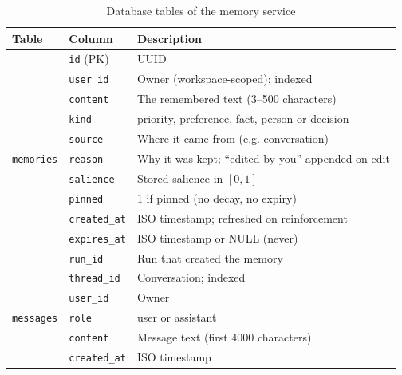 \documentclass[oneside,a4paper,12pt]{report}
\begin{document}
\begin{table}[!htbp]
\begin{center}
\def\arraystretch{1.2}
\small
\begin{tabularx}{\textwidth}{| l | l | X |}
\hline
Table & Column & Description \\ \hline
\multirow{11}{*}{\texttt{memories}} & \texttt{id} (PK) & UUID \\ \cline{2-3}
 & \texttt{user\_id} & Owner (workspace-scoped); indexed \\ \cline{2-3}
 & \texttt{content} & The remembered text (3--500 characters) \\ \cline{2-3}
 & \texttt{kind} & priority, preference, fact, person or decision \\ \cline{2-3}
 & \texttt{source} & Where it came from (e.g. conversation) \\ \cline{2-3}
 & \texttt{reason} & Why it was kept; ``edited by you'' appended on edit \\ \cline{2-3}
 & \texttt{salience} & Stored salience in $[0,1]$ \\ \cline{2-3}
 & \texttt{pinned} & 1 if pinned (no decay, no expiry) \\ \cline{2-3}
 & \texttt{created\_at} & ISO timestamp; refreshed on reinforcement \\ \cline{2-3}
 & \texttt{expires\_at} & ISO timestamp or NULL (never) \\ \cline{2-3}
 & \texttt{run\_id} & Run that created the memory \\ \hline
\multirow{5}{*}{\texttt{messages}} & \texttt{thread\_id} & Conversation; indexed \\ \cline{2-3}
 & \texttt{user\_id} & Owner \\ \cline{2-3}
 & \texttt{role} & user or assistant \\ \cline{2-3}
 & \texttt{content} & Message text (first 4000 characters) \\ \cline{2-3}
 & \texttt{created\_at} & ISO timestamp \\ \hline
\end{tabularx}
\end{center}
\caption{Database tables of the memory service}
\label{tab:db}
\end{table}
\end{document}
